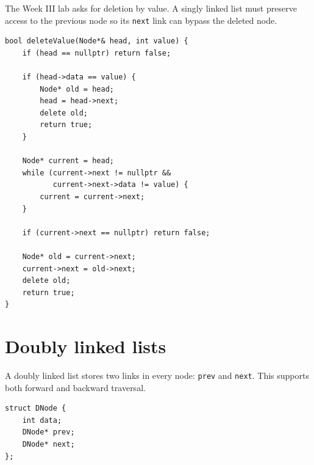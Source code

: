 The Week III lab asks for deletion by value. A singly linked list must preserve access to the previous node so its \texttt{next} link can bypass the deleted node.

\begin{lstlisting}
bool deleteValue(Node*& head, int value) {
    if (head == nullptr) return false;

    if (head->data == value) {
        Node* old = head;
        head = head->next;
        delete old;
        return true;
    }

    Node* current = head;
    while (current->next != nullptr &&
           current->next->data != value) {
        current = current->next;
    }

    if (current->next == nullptr) return false;

    Node* old = current->next;
    current->next = old->next;
    delete old;
    return true;
}
\end{lstlisting}

\section{Doubly linked lists}

A doubly linked list stores two links in every node: \texttt{prev} and \texttt{next}. This supports both forward and backward traversal.

\begin{mlfigure}
\end{mlfigure}

\begin{lstlisting}
struct DNode {
    int data;
    DNode* prev;
    DNode* next;
};
\end{lstlisting}

